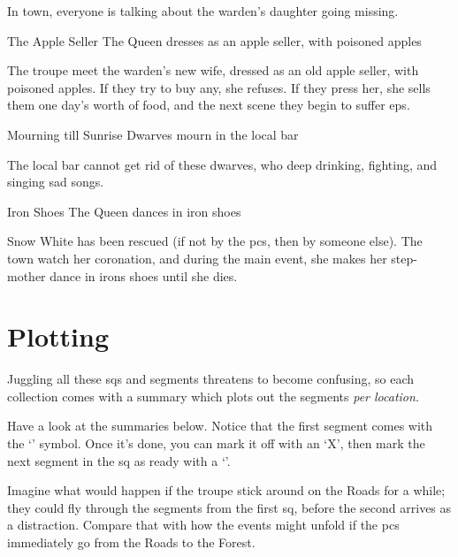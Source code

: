 \begin{multicols}{2}
In town, everyone is talking about the \gls{warden}'s daughter going missing.

{The Apple Seller}%
{The Queen dresses as an apple seller, with poisoned apples}%

The troupe meet the \gls{warden}'s new wife, dressed as an old apple seller, with poisoned apples.
If they try to buy any, she refuses.
If they press her, she sells them one day's worth of food, and the next scene they begin to suffer \glspl{ep}.

{Mourning till Sunrise}%
{Dwarves mourn in the local bar}%

The local bar cannot get rid of these dwarves, who deep drinking, fighting, and singing sad songs. 

{Iron Shoes}%
{The Queen dances in iron shoes}%

Snow White has been rescued (if not by the \glspl{pc}, then by someone else).
The town watch her coronation, and during the main event, she makes her step-mother dance in irons shoes until she dies.

\end{multicols}

\section{Plotting }

\begin{multicols}{2}

\noindent
Juggling all these \glspl{sq} and \glspl{segment} threatens to become confusing, so each collection comes with a summary which plots out the \glspl{segment} \emph{per location}.

Have a look at the summaries below.
Notice that the first \gls{segment} comes with the `\sqr' symbol.
Once it's done, you can mark it off with an `X', then mark the next \gls{segment} in the \gls{sq} as ready with a `\sqr'.

Imagine what would happen if the troupe stick around on the Roads for a while; they could fly through the \glspl{segment} from the first \gls{sq}, before the second arrives as a distraction.
Compare that with how the events might unfold if the \glspl{pc} immediately go from the Roads to the Forest.

\end{multicols}


